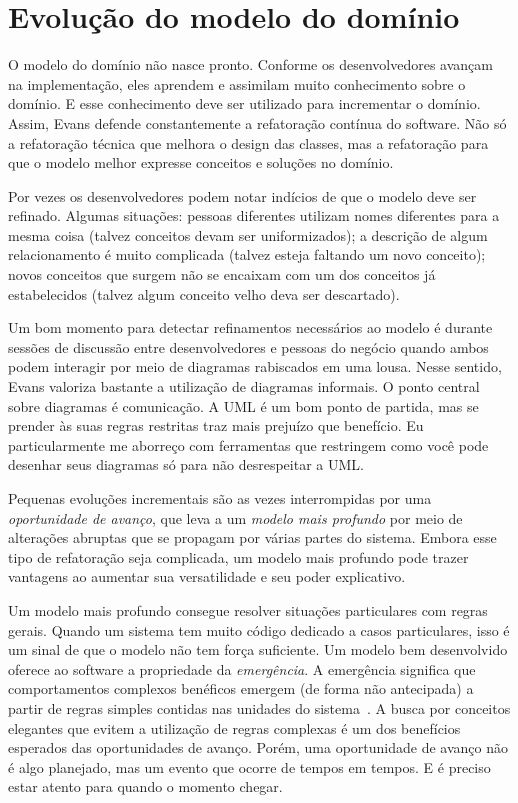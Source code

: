 \documentclass[a4paper, 12pt]{article}
\begin{document}
\section{Evolução do modelo do domínio}

O modelo do domínio não nasce pronto. Conforme os desenvolvedores avançam na implementação, eles aprendem e assimilam muito conhecimento sobre o domínio. E esse conhecimento deve ser utilizado para incrementar o domínio. Assim, Evans defende constantemente a refatoração contínua do software. Não só a refatoração técnica que melhora o design das classes, mas a refatoração para que o modelo melhor expresse conceitos e soluções no domínio.

Por vezes os desenvolvedores podem notar indícios de que o modelo deve ser refinado. Algumas situações: pessoas diferentes utilizam nomes diferentes para a mesma coisa (talvez conceitos devam ser uniformizados); a descrição de algum relacionamento é muito complicada (talvez esteja faltando um novo conceito); novos conceitos que surgem não se encaixam com um dos conceitos já estabelecidos (talvez algum conceito velho deva ser descartado).

Um bom momento para detectar refinamentos necessários ao modelo é durante sessões de discussão entre desenvolvedores e pessoas do negócio quando ambos podem interagir por meio de diagramas rabiscados em uma lousa. Nesse sentido, Evans valoriza bastante a utilização de diagramas informais. O ponto central sobre diagramas é comunicação. A UML é um bom ponto de partida, mas se prender às suas regras restritas traz mais prejuízo que benefício. Eu particularmente me aborreço com ferramentas que restringem como você pode desenhar seus diagramas só para não desrespeitar a UML.

Pequenas evoluções incrementais são as vezes interrompidas por uma \emph{oportunidade de avanço}, que leva a um \emph{modelo mais profundo} por meio de alterações abruptas que se propagam por várias partes do sistema. Embora esse tipo de refatoração seja complicada, um modelo mais profundo pode trazer vantagens ao aumentar sua versatilidade e seu poder explicativo. 

Um modelo mais profundo consegue resolver situações particulares com regras gerais. Quando um sistema tem muito código dedicado a casos particulares, isso é um sinal de que o modelo não tem força suficiente. Um modelo bem desenvolvido oferece ao software a propriedade da \emph{emergência}. A emergência significa que comportamentos complexos benéficos emergem (de forma não antecipada) a partir de regras simples contidas nas unidades do sistema~\cite{37signals2006GettingReal}. A busca por conceitos elegantes que evitem a utilização de regras complexas é um dos benefícios esperados das oportunidades de avanço. Porém, uma oportunidade de avanço não é algo planejado, mas um evento que ocorre de tempos em tempos. E é preciso estar atento para quando o momento chegar.
\end{document}
